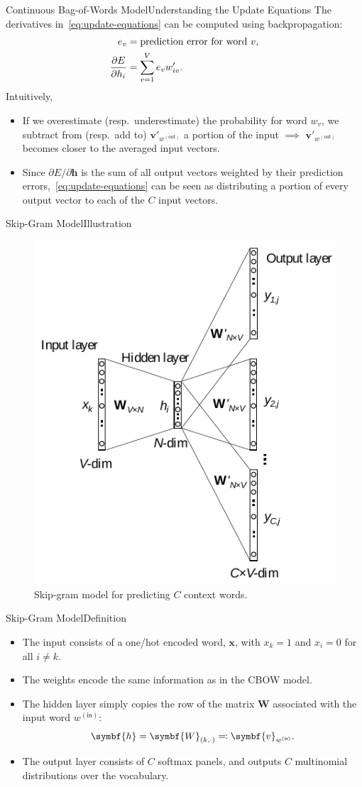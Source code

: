 \documentclass[usepdftitle=false]{beamer}
\theoremstyle{definition}
\renewcommand*{\vec}{\symbf}%
\newcommand*{\mat}{\symbf}%
\newcommand*{\ins}{\mathsf{(in)}}
\newcommand*{\outs}{\mathsf{(out)}}
\begin{document}
\begin{frame}{Continuous Bag-of-Words Model}{Understanding the Update
    Equations}
  The derivatives in~\eqref{eq:update-equations} can be computed using
  backpropagation:
  \begin{align*}
    e_v &= \text{prediction error for word}\ v\text,\\
    \frac{\partial E}{\partial h_i} &= \sum\limits_{v = 1}^{V} e_v w'_{i v}\text.
  \end{align*}
  Intuitively,
  \begin{itemize}
  \item If we overestimate (resp.\ underestimate) the probability for word
    \(w_v\), we subtract from (resp.\ add to) \(\vec{v}'_{w^{\outs}}\) a portion of
    the input \(\implies\) \(\vec{v}'_{w^{\outs}}\) becomes closer to the averaged
    input vectors.
  \item Since \(\partial E / {\partial \vec{h}}\) is the sum of all
    output vectors weighted by their prediction
    errors,~\eqref{eq:update-equations} can be seen as distributing a
    portion of every output vector to each of the \(C\) input vectors.
  \end{itemize}
\end{frame}

\begin{frame}{Skip-Gram Model}{Illustration}
  \begin{figure}
    \centering
    \includegraphics[width=.4\textwidth]{Skip-Gram.pdf}
    \caption{Skip-gram model for predicting \(C\) context words.}
  \end{figure}
\end{frame}

\begin{frame}{Skip-Gram Model}{Definition}
  \begin{itemize}
  \item The input consists of a one\-/hot encoded word, \(\vec{x}\),
    with \(x_k = 1\) and \(x_i = 0\) for all \(i \ne k\).
  \item The weights encode the same information as in the CBOW model.
  \item The hidden layer simply copies the row of the matrix
    \(\mat{W}\) associated with the input word \(w^{\ins}\):
    \[
      \vec{h} = \mat{W}_{(k, \cdot)} \eqqcolon
      \vec{v}_{w^{\ins}}\text.
    \]
  \item The output layer consists of \(C\) softmax panels, and outputs
    \(C\) multinomial distributions over the vocabulary.
  \end{itemize}
\end{frame}
\end{document}
